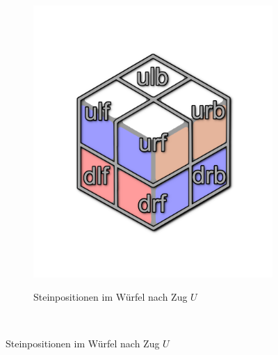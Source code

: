 \documentclass[12pt,a4paper, usenames, dvipsnames]{article}
\theoremstyle{mystyle}
\theoremstyle{definition}
\begin{document}
\begin{figure}[h]
\begin{minipage}[b][][b]{0.04\textwidth}$\ $ 
\end{minipage}\begin{minipage}[b][][b]{0.43\textwidth}

\begin{figure}[H]
\centering
\includegraphics[scale=0.14]{caged_spin.png}\\
\caption[Steinpositionen im Würfel nach Zug $U$]{Steinpositionen im Würfel nach Zug $U$}
\label{Abbildung_SteinpositionnamenNachU1}
\end{figure}

\end{minipage}\begin{minipage}[b][][b]{0.06\textwidth}$\ $ \end{minipage}\begin{minipage}[b][][b]{0.43\textwidth}


\end{minipage}
\end{figure}
\end{document}
